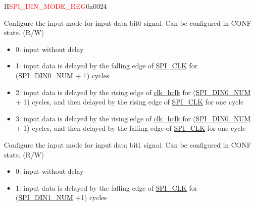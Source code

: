 \begin{register}{H}{\textcolor{red}{SPI\_DIN\_MODE\_REG}}{0x{}0024}\label{regdesc:SPIDINMODEREG}
%
%
%
%
%
%
%
%
%
%
\regnewline%
\begin{regdesc}\begin{reglist}
\label{fielddesc:SPIDIN0MODE}\item [SPI\_DIN0\_MODE] Configure the input mode for input data bit0 signal. Can be configured in CONF state. (R/W)

\begin{itemize}
    \item 0: input without delay
    \item 1: input data is delayed by the falling edge of \hyperref[clk:SPICLK]{SPI\_CLK} for (\hyperref[fielddesc:SPIDIN0NUM]{SPI\_DIN0\_NUM} + 1) cycles
    \item 2: input data is delayed by the rising edge of \hyperref[clk:clkhclk]{clk\_hclk} for (\hyperref[fielddesc:SPIDIN0NUM]{SPI\_DIN0\_NUM} + 1) cycles, and then delayed by the rising edge of \hyperref[clk:SPICLK]{SPI\_CLK} for one cycle
    \item 3: input data is delayed by the rising edge of \hyperref[clk:clkhclk]{clk\_hclk} for (\hyperref[fielddesc:SPIDIN0NUM]{SPI\_DIN0\_NUM} + 1) cycles, and then delayed by the falling edge of \hyperref[clk:SPICLK]{SPI\_CLK} for one cycle
\end{itemize}

\label{fielddesc:SPIDIN1MODE}\item [SPI\_DIN1\_MODE] Configure the input mode for input data bit1 signal. Can be configured in CONF state. (R/W)

\begin{itemize}
    \item 0: input without delay
    \item 1: input data is delayed by the falling edge of \hyperref[clk:SPICLK]{SPI\_CLK} for (\hyperref[fielddesc:SPIDIN1NUM]{SPI\_DIN1\_NUM} +1) cycles


\end{itemize}
\end{reglist}
\end{regdesc}
\end{register}
